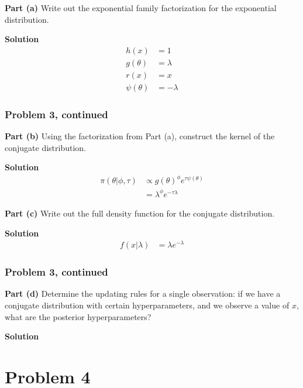 \documentclass[12pt]{article}
\theoremstyle{definition}
\begin{document}
\noindent
{\bf Part (a)} Write out the exponential family factorization for the exponential distribution.

\bigskip
\noindent
{\bf Solution}
\begin{align*}
h(x) &= 1\\
g(\theta) &= \lambda\\
r(x) &= x\\
\psi(\theta) &= -\lambda
\end{align*}


\newpage
\subsubsection*{Problem 3, continued}

\noindent
{\bf Part (b)} Using the factorization from Part (a), construct the kernel of the conjugate distribution.

\bigskip
\noindent
{\bf Solution}
\begin{align*}
\pi(\theta|\phi, \tau) &\propto g(\theta)^\phi e^{\tau \psi(\theta)}\\
&= \lambda^\phi e^{-\tau\lambda}
\end{align*}



\vspace{0.5in}
\noindent
{\bf Part (c)} Write out the full density function for the conjugate distribution.

\bigskip
\noindent
{\bf Solution}
\begin{align*}
f(x|\lambda) &= \lambda e^{-\lambda}
\end{align*}




\newpage
\subsubsection*{Problem 3, continued}

\noindent
{\bf Part (d)} Determine the updating rules for a single observation: if we have a conjugate distribution with certain hyperparameters, and we observe a value of $x$, what are the posterior hyperparameters? 

\bigskip
\noindent
{\bf Solution}







\newpage
\section*{Problem 4}
\end{document}
